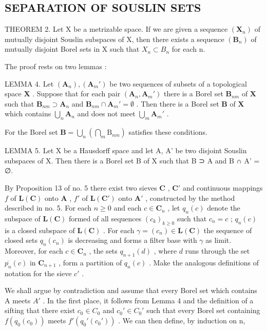 \subsection{SEPARATION OF SOUSLIN SETS}

THEOREM 2. Let X be a metrizable space. If we are given a sequence \((\mathbf{X}_{n})\) of mutually disjoint Souslin subspaces of X, then there exists a sequence \((\mathbf{B}_{n})\) of mutually disjoint Borel sets in X such that \(X_{n} \subset B_{n}\) for each n.

The proof rests on two lemmas :

LEMMA 4. Let \((\mathbf{A}_n), (\mathbf{A}_m')\) be two sequences of subsets of a topological space \(\mathbf{X}\) . Suppose that for each pair \((\mathbf{A}_n, \mathbf{A}_m')\) there is a Borel set \(\mathbf{B}_{nm}\) of \(\mathbf{X}\) such that \(\mathbf{B}_{nm} \supset \mathbf{A}_n\) and \(\mathbf{B}_{nm} \cap \mathbf{A}_m' = \emptyset\) . Then there is a Borel set \(\mathbf{B}\) of \(\mathbf{X}\) which contains \(\bigcup_{n} \mathbf{A}_n\) and does not meet \(\bigcup_{m} \mathbf{A}_m'\) .

For the Borel set \(\mathbf{B} = \bigcup_{n}\left(\bigcap_{m}\mathrm{B}_{nm}\right)\) satisfies these conditions.

LEMMA 5. Let X be a Hausdorff space and let A, A' be two disjoint Souslin subspaces of X. Then there is a Borel set B of X such that B ⊃ A and B ∩ A' = ∅.

By Proposition 13 of no. 5 there exist two sieves \(\mathbf{C}\) , \(\mathbf{C}'\) and continuous mappings \(f\) of \(\mathbf{L}(\mathbf{C})\) onto \(\mathbf{A}\) , \(f'\) of \(\mathbf{L}(\mathbf{C}')\) onto \(\mathbf{A}'\) , constructed by the method described in no. 5. For each \(n \geqslant 0\) and each \(c \in \mathbf{C}_n\) , let \(q_n(c)\) denote the subspace of \(\mathbf{L}(\mathbf{C})\) formed of all sequences \((c_k)_{k \geqslant 0}\) such that \(c_n = c\) ; \(q_n(c)\) is a closed subspace of \(\mathbf{L}(\mathbf{C})\) . For each \(\gamma = (c_n) \in \mathbf{L}(\mathbf{C})\) the sequence of closed sets \(q_n(c_n)\) is decreasing and forms a filter base with \(\gamma\) as limit. Moreover, for each \(c \in \mathbf{C}_n\) , the sets \(q_{n+1}(d)\) , where \(d\) runs through the set \(\overline{p_n}(c)\) in \(\mathbf{C}_{n+1}\) , form a partition of \(q_n(c)\) . Make the analogous definitions of notation for the sieve \(c'\) .

We shall argue by contradiction and assume that every Borel set which contains A meets \(A'\) . In the first place, it follows from Lemma 4 and the definition of a sifting that there exist \(c_{0} \in C_{0}\) and \(c_{0}' \in C_{0}'\) such that every Borel set containing \(f(q_{0}(c_{0}))\) meets \(f'(q_{0}'(c_{0}'))\) . We can then define, by induction on n,

